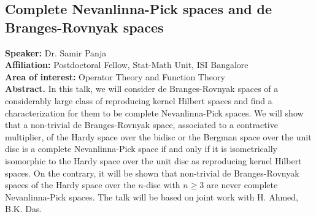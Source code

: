 \subsection*{Complete Nevanlinna-Pick spaces and  de Branges-Rovnyak spaces} %
\noindent
\textbf{Speaker:} Dr. Samir Panja \\ %
\textbf{Affiliation:} Postdoctoral Fellow, Stat-Math Unit, ISI Bangalore \\ %
\textbf{Area of interest:} Operator Theory and Function Theory \\

\noindent\textbf{Abstract.} In this talk, we  will consider de Branges-Rovnyak spaces of a considerably large class of reproducing kernel Hilbert spaces and find a characterization for them to be complete Nevanlinna-Pick spaces. 
    We will show that a non-trivial de Branges-Rovnyak space, associated to a contractive multiplier, of the Hardy space over the bidisc or the Bergman space over the unit disc is a complete Nevanlinna-Pick space if and only if it is isometrically isomorphic to the Hardy space over the unit disc as reproducing kernel Hilbert spaces. On the contrary, it will be shown that non-trivial de Branges-Rovnyak spaces of the Hardy space over the $n$-disc with $n\geq 3$ are never complete Nevanlinna-Pick spaces.  The talk will be based on joint work with H. Ahmed, B.K. Das.


